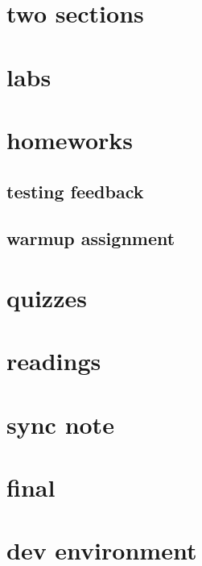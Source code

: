 %

\section{two sections}


\section{labs}


\section{homeworks}


\subsection{testing feedback}


\subsection{warmup assignment}


\section{quizzes}


\section{readings}


\section{sync note}


\section{final}


\section{dev environment}


